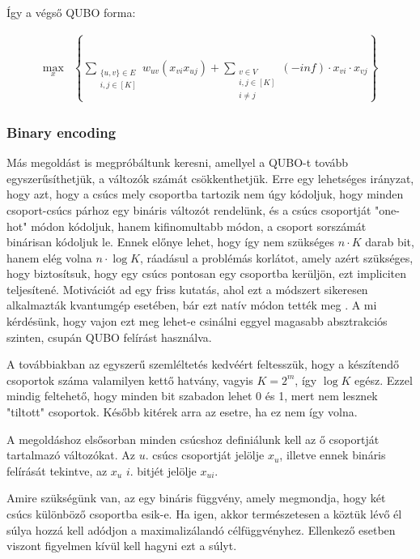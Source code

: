 Így a végső QUBO forma:

\begin{align} 
	\max_{x} & \left\{\sum _{\substack{\{u,v\} \in E \\ i,j \in [K]}} w_{uv}(x_{vi}  x_{uj}) + \sum _{\substack{v \in V \\ i,j \in [K] \\  i \neq j}} (-inf) \cdot x_{vi} \cdot x_{vj}\right\} 
\end{align}



\subsubsection{Binary encoding}

Más megoldást is megpróbáltunk keresni, amellyel a QUBO-t tovább egyszerűsíthetjük, a változók számát csökkenthetjük. Erre egy lehetséges irányzat, hogy azt, hogy a csúcs mely csoportba tartozik nem úgy kódoljuk, hogy minden csoport-csúcs párhoz egy bináris változót rendelünk, és a csúcs csoportját "one-hot" módon kódoljuk, hanem kifinomultabb módon, a csoport sorszámát binárisan kódoljuk le. Ennek előnye lehet, hogy így nem szükséges $n \cdot K$ darab bit, hanem elég volna $n \cdot \log K$, ráadásul a problémás korlátot, amely azért szükséges, hogy biztosítsuk, hogy egy csúcs pontosan egy csoportba kerüljön, ezt impliciten teljesítené. Motivációt ad egy friss kutatás, ahol ezt a módszert sikeresen alkalmazták kvantumgép esetében, bár ezt natív módon tették meg  \cite{fuchs2020efficient}. A mi kérdésünk, hogy vajon ezt meg lehet-e csinálni eggyel magasabb absztrakciós szinten, csupán QUBO felírást használva.

A továbbiakban az egyszerű szemléltetés kedvéért feltesszük, hogy a készítendő csoportok száma valamilyen kettő hatvány, vagyis $K=2^m$, így $\log K$ egész. Ezzel mindig feltehető, hogy minden bit szabadon lehet 0 és 1, mert nem lesznek "tiltott" csoportok. Később kitérek arra az esetre, ha ez nem így volna.

A megoldáshoz elsősorban minden csúcshoz definiálunk kell az ő csoportját tartalmazó változókat. Az $u.$ csúcs csoportját jelölje $x_u$, illetve ennek bináris felírását tekintve, az $x_u$ $i.$ bitjét jelölje $x_{ui}$.

Amire szükségünk van, az egy bináris függvény, amely megmondja, hogy két csúcs különböző csoportba esik-e. Ha igen, akkor természetesen a köztük lévő él súlya hozzá kell adódjon a maximalizálandó célfüggvényhez. Ellenkező esetben viszont figyelmen kívül kell hagyni ezt a súlyt.

